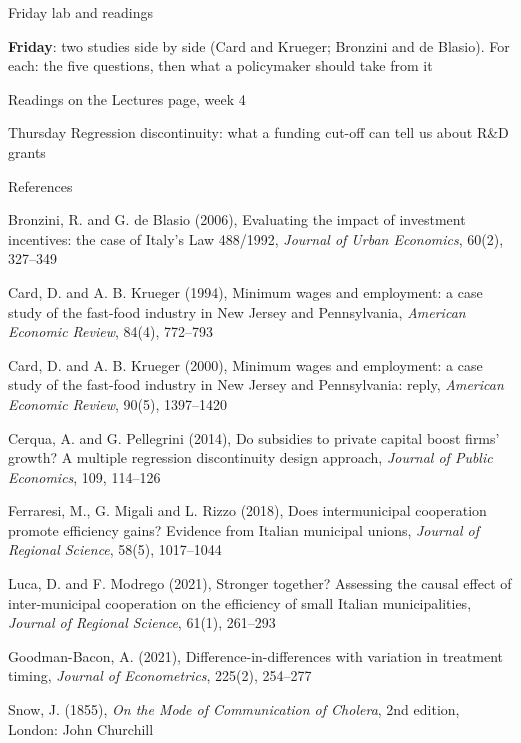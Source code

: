 \documentclass[aspectratio=169,xcolor=table]{beamer}
\begin{document}
\begin{frame}{Friday lab and readings}
\bi
  \item \textbf{Friday}: two studies side by side (Card and Krueger; Bronzini and de Blasio). For each: the five questions, then what a policymaker should take from it
  \item Readings on the Lectures page, week 4
\ei
\vspace{0.15cm}
\begin{exampleblock}{Thursday}
Regression discontinuity: what a funding cut-off can tell us about R\&D grants
\end{exampleblock}
\end{frame}

\begin{frame}{References}
\tiny
\bi
  \item Bronzini, R. and G. de Blasio (2006), Evaluating the impact of investment incentives: the case of Italy's Law 488/1992, \textit{Journal of Urban Economics}, 60(2), 327--349
  \item Card, D. and A. B. Krueger (1994), Minimum wages and employment: a case study of the fast-food industry in New Jersey and Pennsylvania, \textit{American Economic Review}, 84(4), 772--793
  \item Card, D. and A. B. Krueger (2000), Minimum wages and employment: a case study of the fast-food industry in New Jersey and Pennsylvania: reply, \textit{American Economic Review}, 90(5), 1397--1420
  \item Cerqua, A. and G. Pellegrini (2014), Do subsidies to private capital boost firms' growth? A multiple regression discontinuity design approach, \textit{Journal of Public Economics}, 109, 114--126
  \item Ferraresi, M., G. Migali and L. Rizzo (2018), Does intermunicipal cooperation promote efficiency gains? Evidence from Italian municipal unions, \textit{Journal of Regional Science}, 58(5), 1017--1044
  \item Luca, D. and F. Modrego (2021), Stronger together? Assessing the causal effect of inter-municipal cooperation on the efficiency of small Italian municipalities, \textit{Journal of Regional Science}, 61(1), 261--293
  \item Goodman-Bacon, A. (2021), Difference-in-differences with variation in treatment timing, \textit{Journal of Econometrics}, 225(2), 254--277
  \item Snow, J. (1855), \textit{On the Mode of Communication of Cholera}, 2nd edition, London: John Churchill
\ei
\end{frame}

\pelQuestions
\end{document}
